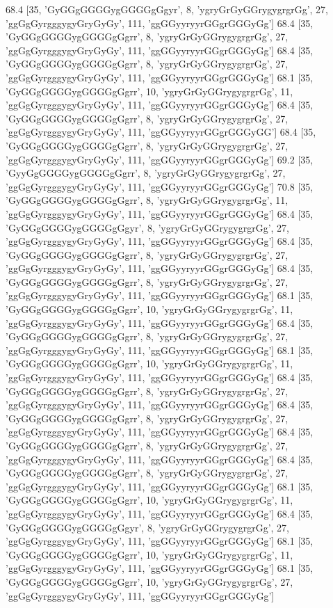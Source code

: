 68.4 [35, 'GyGGgGGGGygGGGGgGgyr', 8, 'ygryGrGyGGrygygrgrGg', 27, 'ggGgGyrgggygyGryGyGy', 111, 'ggGGyyryyrGGgrGGGyGg']
68.4 [35, 'GyGGgGGGGygGGGGgGgrr', 8, 'ygryGrGyGGrygygrgrGg', 27, 'ggGgGyrgggygyGryGyGy', 111, 'ggGGyyryyrGGgrGGGyGg']
68.4 [35, 'GyGGgGGGGygGGGGgGgrr', 8, 'ygryGrGyGGrygygrgrGg', 27, 'ggGgGyrgggygyGryGyGy', 111, 'ggGGyyryyrGGgrGGGyGg']
68.1 [35, 'GyGGgGGGGygGGGGgGgrr', 10, 'ygryGrGyGGrygygrgrGg', 11, 'ggGgGyrgggygyGryGyGy', 111, 'ggGGyyryyrGGgrGGGyGg']
68.4 [35, 'GyGGgGGGGygGGGGgGgrr', 8, 'ygryGrGyGGrygygrgrGg', 27, 'ggGgGyrgggygyGryGyGy', 111, 'ggGGyyryyrGGgrGGGyGG']
68.4 [35, 'GyGGgGGGGygGGGGgGgrr', 8, 'ygryGrGyGGrygygrgrGg', 27, 'ggGgGyrgggygyGryGyGy', 111, 'ggGGyyryyrGGgrGGGyGg']
69.2 [35, 'GyyGgGGGGygGGGGgGgrr', 8, 'ygryGrGyGGrygygrgrGg', 27, 'ggGgGyrgggygyGryGyGy', 111, 'ggGGyyryyrGGgrGGGyGg']
70.8 [35, 'GyGGgGGGGygGGGGgGgrr', 8, 'ygryGrGyGGrygygrgrGg', 11, 'ggGgGyrgggygyGryGyGy', 111, 'ggGGyyryyrGGgrGGGyGg']
68.4 [35, 'GyGGgGGGGygGGGGgGgyr', 8, 'ygryGrGyGGrygygrgrGg', 27, 'ggGgGyrgggygyGryGyGy', 111, 'ggGGyyryyrGGgrGGGyGg']
68.4 [35, 'GyGGgGGGGygGGGGgGgrr', 8, 'ygryGrGyGGrygygrgrGg', 27, 'ggGgGyrgggygyGryGyGy', 111, 'ggGGyyryyrGGgrGGGyGg']
68.4 [35, 'GyGGgGGGGygGGGGgGgrr', 8, 'ygryGrGyGGrygygrgrGg', 27, 'ggGgGyrgggygyGryGyGy', 111, 'ggGGyyryyrGGgrGGGyGg']
68.1 [35, 'GyGGgGGGGygGGGGgGgrr', 10, 'ygryGrGyGGrygygrgrGg', 11, 'ggGgGyrgggygyGryGyGy', 111, 'ggGGyyryyrGGgrGGGyGg']
68.4 [35, 'GyGGgGGGGygGGGGgGgrr', 8, 'ygryGrGyGGrygygrgrGg', 27, 'ggGgGyrgggygyGryGyGy', 111, 'ggGGyyryyrGGgrGGGyGg']
68.1 [35, 'GyGGgGGGGygGGGGgGgrr', 10, 'ygryGrGyGGrygygrgrGg', 11, 'ggGgGyrgggygyGryGyGy', 111, 'ggGGyyryyrGGgrGGGyGg']
68.4 [35, 'GyGGgGGGGygGGGGgGgrr', 8, 'ygryGrGyGGrygygrgrGg', 27, 'ggGgGyrgggygyGryGyGy', 111, 'ggGGyyryyrGGgrGGGyGg']
68.4 [35, 'GyGGgGGGGygGGGGgGgrr', 8, 'ygryGrGyGGrygygrgrGg', 27, 'ggGgGyrgggygyGryGyGy', 111, 'ggGGyyryyrGGgrGGGyGg']
68.4 [35, 'GyGGgGGGGygGGGGgGgrr', 8, 'ygryGrGyGGrygygrgrGg', 27, 'ggGgGyrgggygyGryGyGy', 111, 'ggGGyyryyrGGgrGGGyGg']
68.4 [35, 'GyGGgGGGGygGGGGgGgrr', 8, 'ygryGrGyGGrygygrgrGg', 27, 'ggGgGyrgggygyGryGyGy', 111, 'ggGGyyryyrGGgrGGGyGg']
68.1 [35, 'GyGGgGGGGygGGGGgGgrr', 10, 'ygryGrGyGGrygygrgrGg', 11, 'ggGgGyrgggygyGryGyGy', 111, 'ggGGyyryyrGGgrGGGyGg']
68.4 [35, 'GyGGgGGGGygGGGGgGgyr', 8, 'ygryGrGyGGrygygrgrGg', 27, 'ggGgGyrgggygyGryGyGy', 111, 'ggGGyyryyrGGgrGGGyGg']
68.1 [35, 'GyGGgGGGGygGGGGgGgrr', 10, 'ygryGrGyGGrygygrgrGg', 11, 'ggGgGyrgggygyGryGyGy', 111, 'ggGGyyryyrGGgrGGGyGg']
68.1 [35, 'GyGGgGGGGygGGGGgGgrr', 10, 'ygryGrGyGGrygygrgrGg', 27, 'ggGgGyrgggygyGryGyGy', 111, 'ggGGyyryyrGGgrGGGyGg']
